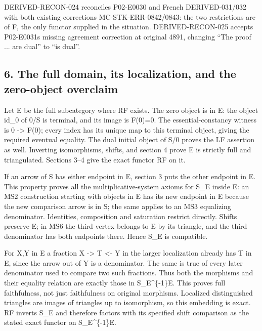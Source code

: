 \documentclass[11pt]{article}
\begin{document}
DERIVED-RECON-024 reconciles P02-E0030 and French DERIVED-031/\allowbreak{}032 with both existing corrections MC-STK-ERR-0842/\allowbreak{}0843:\allowbreak{} the two restrictions are of F,\allowbreak{} the only functor supplied in the situation. DERIVED-RECON-025 accepts P02-E0031\textquotesingle s missing agreement correction at original 4891,\allowbreak{} changing ``The proof ... are dual'' to ``is dual''.

\subsection{\texorpdfstring{6. The full domain,\allowbreak{} its localization,\allowbreak{} and the zero-object overclaim}{6. The full  its  and the zero-object overclaim}}\label{proofs-4166-5089-the-full-domain-its-localization-and-the-zero-object-overclaim}

Let E be the full subcategory where RF exists. The zero object is in E:\allowbreak{} the object id\_\allowbreak{}0 of 0/\allowbreak{}S is terminal,\allowbreak{} and its image is F(0)\allowbreak{}\allowbreak{}=0. The essential-constancy witness is 0 \allowbreak{}-> F(0)\allowbreak{}; every index has its unique map to this terminal object,\allowbreak{} giving the required eventual equality. The dual initial object of S/\allowbreak{}0 proves the LF assertion as well. Inverting isomorphisms,\allowbreak{} shifts,\allowbreak{} and section 4 prove E is strictly full and triangulated. Sections 3–\allowbreak{}4 give the exact functor RF on it.

If an arrow of S has either endpoint in E,\allowbreak{} section 3 puts the other endpoint in E. This property proves all the multiplicative-system axioms for S\_\allowbreak{}E inside E:\allowbreak{} an MS2 construction starting with objects in E has its new endpoint in E because the new comparison arrow is in S; the same applies to an MS3 equalizing denominator. Identities,\allowbreak{} composition and saturation restrict directly. Shifts preserve E; in MS6 the third vertex belongs to E by its triangle,\allowbreak{} and the third denominator has both endpoints there. Hence S\_\allowbreak{}E is compatible.

For X,\allowbreak{}Y in E a fraction X \allowbreak{}-> T \textless- Y in the larger localization already has T in E,\allowbreak{} since the arrow out of Y is a denominator. The same is true of every later denominator used to compare two such fractions. Thus both the morphisms and their equality relation are exactly those in S\_\allowbreak{}E\textasciicircum{}\{-1\}E. This proves full faithfulness,\allowbreak{} not just faithfulness on original morphisms. Localized distinguished triangles are images of triangles up to isomorphism,\allowbreak{} so this embedding is exact. RF inverts S\_\allowbreak{}E and therefore factors with its specified shift comparison as the stated exact functor on S\_\allowbreak{}E\textasciicircum{}\{-1\}E.
\end{document}
